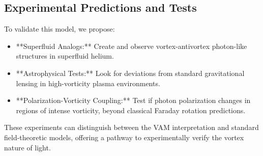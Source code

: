 \subsection{Experimental Predictions and Tests}
To validate this model, we propose:
\begin{itemize}
    \item **Superfluid Analogs:** Create and observe vortex-antivortex photon-like structures in superfluid helium.
    \item **Astrophysical Tests:** Look for deviations from standard gravitational lensing in high-vorticity plasma environments.
    \item **Polarization-Vorticity Coupling:** Test if photon polarization changes in regions of intense vorticity, beyond classical Faraday rotation predictions.
\end{itemize}

These experiments can distinguish between the VAM interpretation and standard field-theoretic models, offering a pathway to experimentally verify the vortex nature of light.
